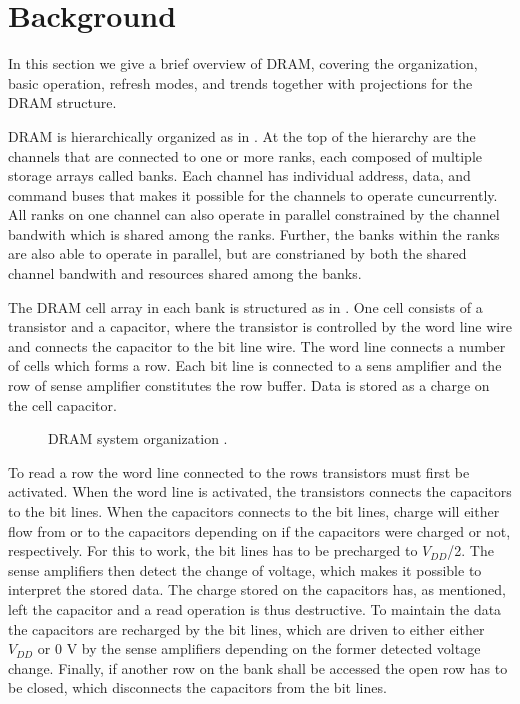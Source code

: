 \section{Background} 
\label{sec:bg}
In this section we give a brief overview of DRAM, covering the organization, basic operation, refresh modes, and trends together with projections for the DRAM structure.

DRAM is hierarchically organized as in . At the top of the hierarchy are the channels that are connected to one or more ranks, each composed of multiple storage arrays called banks. Each channel has individual address, data, and command buses that makes it possible for the channels to operate cuncurrently. All ranks on one channel can also operate in parallel constrained by the channel bandwith which is shared among the ranks. Further, the banks within the ranks are also able to operate in parallel, but are constrianed by both the shared channel bandwith and resources shared among the banks. 

The DRAM cell array in each bank is structured as in . One cell consists of a transistor and a capacitor, where the transistor is controlled by the word line wire and connects the capacitor to the bit line wire. The word line connects a number of cells which forms a row. Each bit line is connected to a sens amplifier and the row of sense amplifier constitutes the row buffer. Data is stored as a charge on the cell capacitor.

\begin{figure*}[t]
    \centering
	\caption{DRAM system organization \cite{raidr}.}
	\label{fig:dram_org}
\end{figure*}

To read a row the word line connected to the rows transistors must first be activated. When the word line is activated, the transistors connects the capacitors to the bit lines. When the capacitors connects to the bit lines, charge will either flow from or to the capacitors depending on if the capacitors were charged or not, respectively. For this to work, the bit lines has to be precharged to \(V_{DD}\)/2. The sense amplifiers then detect the change of voltage, which makes it possible to interpret the stored data. The charge stored on the capacitors has, as mentioned, left the capacitor and a read operation is thus destructive. To maintain the data the capacitors are recharged by the bit lines, which are driven to either either \(V_{DD}\) or 0 V by the sense amplifiers depending on the former detected voltage change. Finally, if another row on the bank shall be accessed the open row has to be closed, which disconnects the capacitors from the bit lines.

